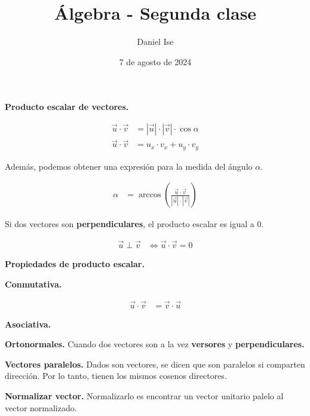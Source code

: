 \documentclass{article}
\title{Álgebra - Segunda clase}
\author{Daniel Ise}
\date{7 de agosto de 2024}
\begin{document}
\maketitle

\textbf{Producto escalar de vectores.}

\begin{align*}
	\vec{u} \cdot \vec{v} & = |\vec{u}| \cdot |\vec{v}| \cdot \cos \alpha \\
	\vec{u} \cdot \vec{v} & = u_x \cdot v_x + u_y \cdot v_y
\end{align*}

Además, podemos obtener una expresión para la medida del ángulo $\alpha$.

\begin{align*}
	\alpha & = \arccos \left(\frac{\vec{u} \cdot \vec{v}}{|\vec{u}| \cdot |\vec{v}|}\right)
\end{align*}

Si dos vectores son \textbf{perpendiculares}, el producto escalar es igual a 0.

\begin{align*}
	\vec{u} \perp \vec{v} & \iff \vec{u} \cdot \vec{v} = 0
\end{align*}

\textbf{Propiedades de producto escalar. }

\textbf{Conmutativa. }

\begin{align*}
	\vec{u} \cdot \vec{v} & = \vec{v} \cdot \vec{u}
\end{align*}

\textbf{Asociativa. }

\textbf{Ortonormales. } Cuando dos vectores son a la vez \textbf{versores} y
\textbf{perpendiculares.}

\textbf{Vectores paralelos. } Dados son vectores, se dicen que son paralelos si
comparten dirección. Por lo tanto, tienen los mismos cosenos directores.

\textbf{Normalizar vector. } Normalizarlo es encontrar un vector unitario
palelo al vector normalizado.
\end{document}

